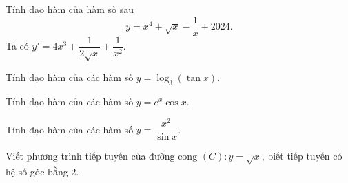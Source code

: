 \begin{bt}%
	Tính đạo hàm của hàm số sau
	\[y=x^4+\sqrt{x}-\dfrac{1}{x}+2024.\]
	\loigiai
	{
		Ta có $y'=4x^3+\dfrac{1}{2\sqrt{x}}+\dfrac{1}{x^2}$.
	}
\end{bt}

\begin{bt}%
	Tính đạo hàm của các hàm số $y=\log_3(\tan x)$.
\end{bt}

\begin{bt}%
	Tính đạo hàm của các hàm số $y=e^x \cos x$.
\end{bt}

\begin{bt}%
	Tính đạo hàm của các hàm số $y=\dfrac{x^2}{\sin x}$.
\end{bt}

\begin{bt}%
	Viết phương trình tiếp tuyến của đường cong $(C)\colon y=\sqrt{x}$, biết tiếp tuyến có hệ số góc bằng $2$.
\end{bt}

